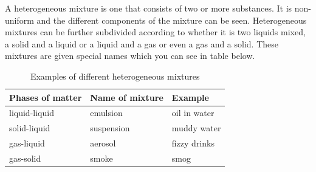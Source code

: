  { A heterogeneous mixture is one that consists of two or more substances. It is non-uniform and the different components of the mixture can be seen. } 
Heterogeneous mixtures can be further subdivided according to whether it is two liquids mixed, a solid and a liquid or a liquid and a gas or even a gas and a solid. These mixtures are given special names which you can see in table below. 
\begin{table}[H]
 \begin{center}
  \begin{tabular}{|l|l|l|}\hline
   \textbf{Phases of matter} & \textbf{Name of mixture} & \textbf{Example} \\ \hline
   liquid-liquid & emulsion & oil in water \\ \hline
   solid-liquid & suspension & muddy water \\ \hline
   gas-liquid & aerosol & fizzy drinks \\ \hline
   gas-solid & smoke & smog \\ \hline
  \end{tabular}

 \end{center}
\caption{Examples of different heterogeneous mixtures}
\label{tab:mixtures}
\end{table}

      \label{m38708*uid6}
